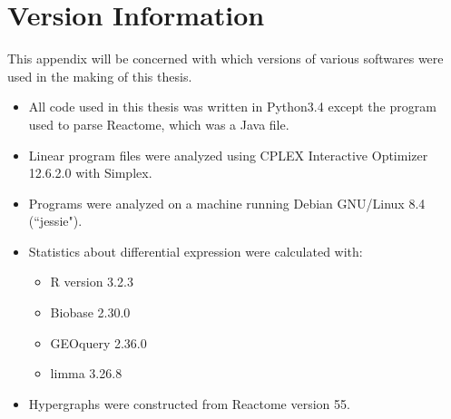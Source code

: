 \documentclass[12pt,twoside]{reedthesis}
\theoremstyle{definition}
\begin{document}
      \chapter{Version Information}

      This appendix will be concerned with which versions of various softwares were used in the making of this thesis.

      \begin{itemize}
        \item{All code used in this thesis was written in Python3.4 except the program used to parse Reactome, which was a Java file.}
        \item{Linear program files were analyzed using CPLEX Interactive Optimizer 12.6.2.0
  with Simplex.}
        \item{Programs were analyzed on a machine running Debian GNU/Linux 8.4 (``jessie").}
        \item{Statistics about differential expression were calculated with:}
        \begin{itemize}
          \item{R version 3.2.3}
          \item{Biobase 2.30.0}
          \item{GEOquery 2.36.0}
          \item{limma 3.26.8}
        \end{itemize}
        \item{Hypergraphs were constructed from Reactome version 55.}
      \end{itemize}



  \backmatter %

    \nocite{*}


%  
 

\end{document}
